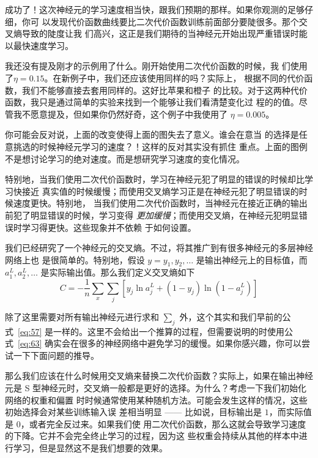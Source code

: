 成功了！这次神经元的学习速度相当快，跟我们预期的那样。如果你观测的足够仔细，你可
以发现代价函数曲线要比二次代价函数训练前面部分要陡很多。那个交叉熵导致的陡度让我
们高兴，这正是我们期待的当神经元开始出现严重错误时能以最快速度学习。

我还没有提及刚才的示例用了什么\learningrate{}。刚开始使用二次代价函数的时候，我
们使用了$\eta = 0.15$。在新例子中，我们还应该使用同样的\learningrate{}吗？实际上，
根据不同的代价函数，我们不能够直接去套用同样的\learningrate{}。这好比苹果和橙子
的比较。对于这两种代价函数，我只是通过简单的实验来找到一个能够让我们看清楚变化过
程的\learningrate{}的值。尽管我不愿意提及，但如果你仍然好奇，这个例子中我使用了
$\eta = 0.005$。

你可能会反对说，上面\learningrate{}的改变使得上面的图失去了意义。谁会在意当%
\learningrate{}的选择是任意挑选的时候神经元学习的速度？！这样的反对其实没有抓住
重点。上面的图例不是想讨论学习的绝对速度。而是想研究学习速度的变化情况。

特别地，当我们使用二次代价函数时，学习在神经元犯了明显的错误的时候却比学习快接近
真实值的时候缓慢；而使用交叉熵学习正是在神经元犯了明显错误的时候速度更快。特别地，
当我们使用二次代价函数时，当神经元在接近正确的输出前犯了明显错误的时候，学习变得%
\emph{更加缓慢}；而使用交叉熵，在神经元犯明显错误时学习得更快。这些现象并不依赖
于如何设置\learningrate{}。

我们已经研究了一个神经元的交叉熵。不过，将其推广到有很多神经元的多层神经网络上也
是很简单的。特别地，假设 $y = y_1, y_2, \ldots$ 是输出神经元上的目标值，而
$a^L_1, a^L_2, \ldots$ 是实际输出值。那么我们定义交叉熵如下
\begin{equation}
  C = -\frac{1}{n} \sum_x \sum_j \left[y_j \ln a^L_j + (1-y_j) \ln (1-a^L_j) \right]
  \label{eq:63}\tag{63}
\end{equation}

除了这里需要对所有输出神经元进行求和 $\sum_j$ 外，这个其实和我们早前的公
式~\eqref{eq:57} 是一样的。这里不会给出一个推算的过程，但需要说明的时使用公
式~\eqref{eq:63} 确实会在很多的神经网络中避免学习的缓慢。如果你感兴趣，你可以尝
试一下下面问题的推导。

那么我们应该在什么时候用交叉熵来替换二次代价函数？实际上，如果在输出神经元是 S
型神经元时，交叉熵一般都是更好的选择。为什么？考虑一下我们初始化网络的权重和偏置
时时候通常使用某种随机方法。可能会发生这样的情况，这些初始选择会对某些训练输入误
差相当明显 —— 比如说，目标输出是 $1$，而实际值是 $0$，或者完全反过来。如果我们使
用二次代价函数，那么这就会导致学习速度的下降。它并不会完全终止学习的过程，因为这
些权重会持续从其他的样本中进行学习，但是显然这不是我们想要的效果。

